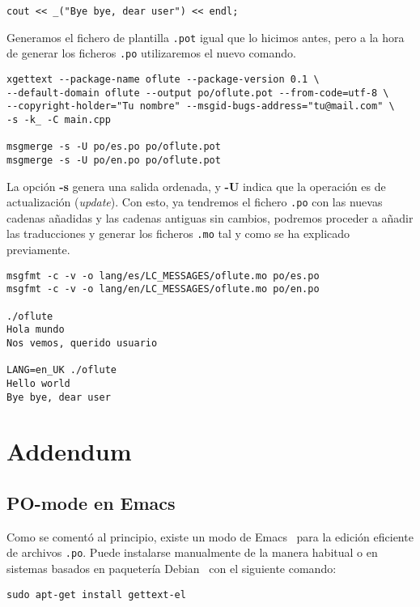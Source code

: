 \begin{verbatim}
cout << _("Bye bye, dear user") << endl;
\end{verbatim}

Generamos el fichero de plantilla \texttt{.pot} igual que lo hicimos antes, pero
a la hora de generar los ficheros \texttt{.po} utilizaremos el nuevo comando.

\begin{verbatim}
xgettext --package-name oflute --package-version 0.1 \
--default-domain oflute --output po/oflute.pot --from-code=utf-8 \
--copyright-holder="Tu nombre" --msgid-bugs-address="tu@mail.com" \
-s -k_ -C main.cpp

msgmerge -s -U po/es.po po/oflute.pot
msgmerge -s -U po/en.po po/oflute.pot 
\end{verbatim}

La opción \textbf{-s} genera una salida ordenada, y \textbf{-U} indica que la
operación es de actualización (\textit{update}). Con esto, ya tendremos el
fichero \texttt{.po} con las nuevas cadenas añadidas y las cadenas antiguas sin
cambios, podremos proceder a añadir las traducciones y generar los ficheros
\texttt{.mo} tal y como se ha explicado previamente.

\begin{verbatim}
msgfmt -c -v -o lang/es/LC_MESSAGES/oflute.mo po/es.po 
msgfmt -c -v -o lang/en/LC_MESSAGES/oflute.mo po/en.po

./oflute 
Hola mundo
Nos vemos, querido usuario

LANG=en_UK ./oflute 
Hello world
Bye bye, dear user
\end{verbatim}

\section{Addendum}

\subsection{PO-mode en Emacs}

Como se comentó al principio, existe un modo de Emacs~\cite{refemacs} para la
edición eficiente de archivos \texttt{.po}. Puede instalarse manualmente de la
manera habitual o en sistemas basados en paquetería Debian~\cite{refdebian} con
el siguiente comando:

\begin{verbatim}
sudo apt-get install gettext-el
\end{verbatim}

